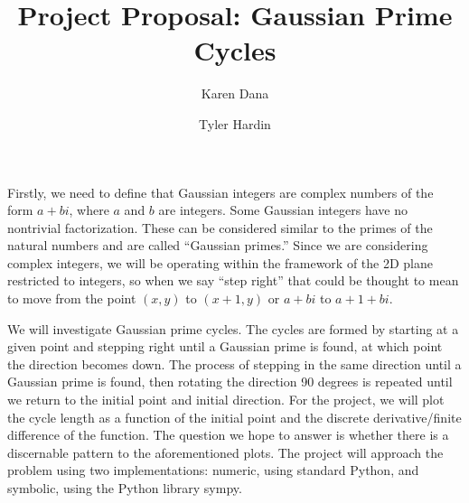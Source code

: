 \documentclass[12pt]{article}
\author{Karen Dana \and Tyler Hardin}
\title{Project Proposal: Gaussian Prime Cycles}
\begin{document}
\maketitle

Firstly, we need to define that Gaussian integers are complex numbers of the
form $a+bi$, where $a$ and $b$ are integers. Some Gaussian integers have no
nontrivial factorization. These can be considered similar to the primes of the
natural numbers and are called “Gaussian primes.” Since we are considering
complex integers, we will be operating within the framework of the 2D plane
restricted to integers, so when we say “step right” that could be thought to
mean to move from the point $(x,y)$ to $(x+1,y)$ or $a+bi$ to $a+1+bi$.

\bigskip
We will investigate Gaussian prime cycles. The cycles are formed by starting
at a given point and stepping right until a Gaussian prime is found, at which
point the direction becomes down. The process of stepping in the same
direction until a Gaussian prime is found, then rotating the direction 90
degrees is repeated until we return to the initial point and initial
direction. For the project, we will plot the cycle length as a function of
the initial point and the discrete derivative/finite difference of the
function. The question we hope to answer is whether there is a discernable
pattern to the aforementioned plots. The project will approach the problem
using two implementations: numeric, using standard Python, and symbolic, using
the Python library sympy.
\end{document}

